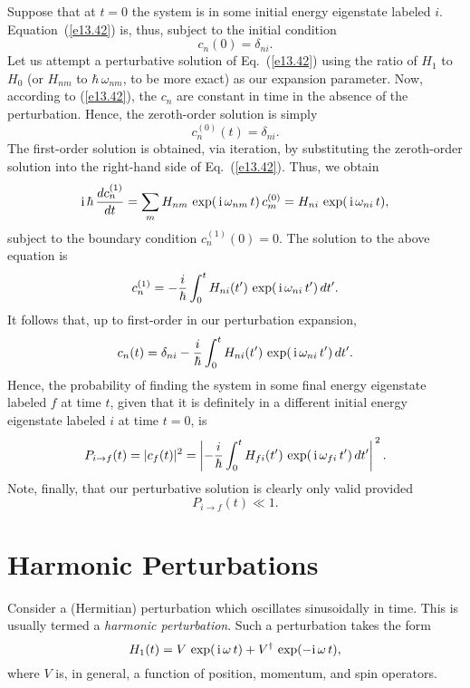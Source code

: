 Suppose that at $t=0$ the system is in some initial energy eigenstate labeled $i$. Equation~(\ref{e13.42}) is, thus,  subject to the initial condition
\begin{equation}
c_n(0) = \delta_{ni}.
\end{equation}
Let us attempt a perturbative solution of Eq.~(\ref{e13.42}) using
the ratio of $H_1$ to $H_0$ (or  $H_{nm}$ to $\hbar\,\omega_{nm}$, to be more exact) as our expansion parameter.
Now, according to (\ref{e13.42}), the $c_n$ are constant in time in the
absence of the perturbation. Hence, the zeroth-order solution is simply
\begin{equation}
c_n^{(0)} (t) = \delta_{ni}.
\end{equation}
The first-order  solution is obtained, via iteration,  by substituting the zeroth-order
solution into the right-hand side of Eq.~(\ref{e13.42}). Thus, we obtain
\begin{equation}
{\rm i}\,\hbar\,\frac{dc_n^{(1)}}{dt} = \sum_m H_{nm}\,\exp(\,{\rm i}\,\omega_{nm}\,t)\,c_m^{(0)} = H_{ni}\,\exp(\,{\rm i}\,\omega_{ni}\,t),
\end{equation}
subject to the boundary condition $c^{(1)}_n(0)=0$. The solution to
the above equation is
\begin{equation}
c_n^{(1)} = -\frac{i}{\hbar}\int_0^t H_{ni}(t')\,\exp(\,{\rm i}\,\omega_{ni}\,t')\,dt'.
\end{equation}
It follows that, up to first-order in our perturbation expansion,
\begin{equation}\label{e13.48}
c_n(t) = \delta_{ni} -\frac{i}{\hbar}\int_0^t H_{ni}(t')\,\exp(\,{\rm i}\,\omega_{ni}\,t')\,dt'.
\end{equation}
Hence, the probability of finding the system in some final energy
eigenstate labeled $f$ at time $t$, given that it is definitely in a different initial energy eigenstate labeled $i$ at time $t=0$, is
\begin{equation}
P_{i\rightarrow f}(t) =|c_f(t)|^2 = \left| -\frac{i}{\hbar}\int_0^t H_{fi}(t')\,\exp(\,{\rm i}\,\omega_{fi}\,t')\,dt'\right|^{\,2}.
\end{equation}
Note, finally, that our perturbative solution is clearly only valid provided
\begin{equation}
P_{i\rightarrow f}(t)\ll 1.
\end{equation}

\section{Harmonic Perturbations}
Consider a (Hermitian) perturbation which oscillates sinusoidally
in time. This is usually termed a {\em harmonic perturbation}. Such
a perturbation takes the form
\begin{equation}\label{e13.51}
H_1(t) = V\,\exp(\,{\rm i}\,\omega\,t) + V^\dag\,\exp(-{\rm i}\,\omega\,t),
\end{equation}
where $V$ is, in general, a function of position, momentum, and spin operators.

